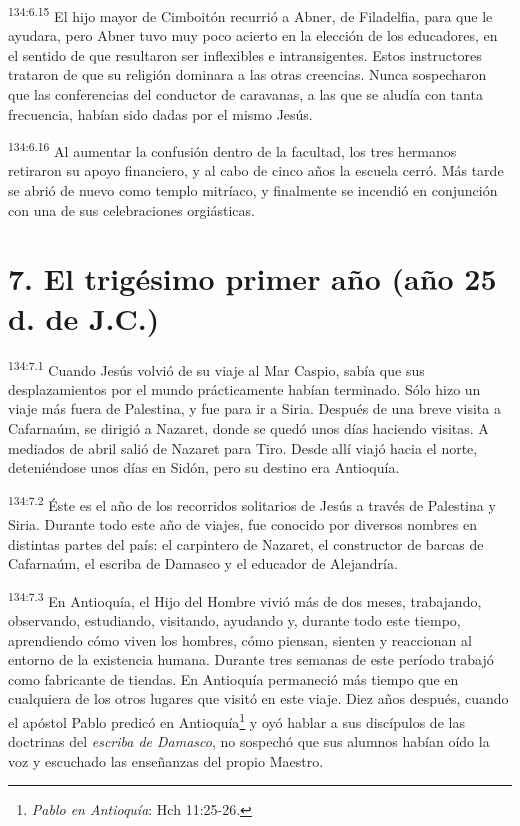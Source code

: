\par 
\textsuperscript{134:6.15} El hijo mayor de Cimboitón recurrió a Abner, de Filadelfia, para que le ayudara, pero Abner tuvo muy poco acierto en la elección de los educadores, en el sentido de que resultaron ser inflexibles e intransigentes. Estos instructores trataron de que su religión dominara a las otras creencias. Nunca sospecharon que las conferencias del conductor de caravanas, a las que se aludía con tanta frecuencia, habían sido dadas por el mismo Jesús.

\par 
\textsuperscript{134:6.16} Al aumentar la confusión dentro de la facultad, los tres hermanos retiraron su apoyo financiero, y al cabo de cinco años la escuela cerró. Más tarde se abrió de nuevo como templo mitríaco, y finalmente se incendió en conjunción con una de sus celebraciones orgiásticas.

\section*{7. El trigésimo primer año (año 25 d. de J.C.)}
\par 
\textsuperscript{134:7.1} Cuando Jesús volvió de su viaje al Mar Caspio, sabía que sus desplazamientos por el mundo prácticamente habían terminado. Sólo hizo un viaje más fuera de Palestina, y fue para ir a Siria. Después de una breve visita a Cafarnaúm, se dirigió a Nazaret, donde se quedó unos días haciendo visitas. A mediados de abril salió de Nazaret para Tiro. Desde allí viajó hacia el norte, deteniéndose unos días en Sidón, pero su destino era Antioquía.

\par 
\textsuperscript{134:7.2} Éste es el año de los recorridos solitarios de Jesús a través de Palestina y Siria. Durante todo este año de viajes, fue conocido por diversos nombres en distintas partes del país: el carpintero de Nazaret, el constructor de barcas de Cafarnaúm, el escriba de Damasco y el educador de Alejandría.

\par 
\textsuperscript{134:7.3} En Antioquía, el Hijo del Hombre vivió más de dos meses, trabajando, observando, estudiando, visitando, ayudando y, durante todo este tiempo, aprendiendo cómo viven los hombres, cómo piensan, sienten y reaccionan al entorno de la existencia humana. Durante tres semanas de este período trabajó como fabricante de tiendas. En Antioquía permaneció más tiempo que en cualquiera de los otros lugares que visitó en este viaje. Diez años después, cuando el apóstol Pablo predicó en Antioquía\footnote{\textit{Pablo en Antioquía}: Hch 11:25-26.} y oyó hablar a sus discípulos de las doctrinas del \textit{escriba de Damasco}, no sospechó que sus alumnos habían oído la voz y escuchado las enseñanzas del propio Maestro.

